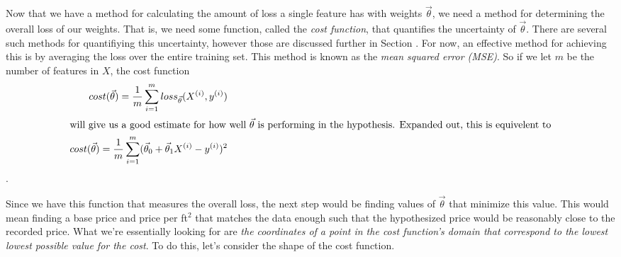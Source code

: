 Now that we have a method for calculating the amount of loss a single feature
has with weights $\vec\theta$, we need a method for determining the overall loss of
our weights. That is, we need some function, called the \emph{cost function},
that quantifies the uncertainty of $\vec\theta$. There are several such methods for
quantifiying this uncertainty, however those are discussed further in Section
\placeholder. For now, an effective method for achieving this is by averaging
the loss over the entire training set. This method is known as the \emph{mean
squared error (MSE)}. So if we let $m$ be the number of features in $X$, the
cost function
\begin{subequations}
    \begin{align}
        cost(\vec\theta) = \frac{1}{m}\sum_{i=1}^m loss_{\vec\theta}(X^{(i)}, y^{(i)}) \\
    \intertext{will give us a good estimate for how well $\vec\theta$ is performing
        in the hypothesis. Expanded out, this is equivelent to}
        cost(\vec\theta) = \frac{1}{m}\sum_{i=1}^m (\vec\theta_0 + \vec\theta_1X^{(i)} -
        y^{(i)})^2
    \end{align}
\end{subequations}
.

Since we have this function that measures the overall loss, the next step would
be finding values of $\vec\theta$ that minimize this value. This would mean finding
a base price and price per ft$^2$ that matches the data enough such that the
hypothesized price would be reasonably close to the recorded price. What we're
essentially looking for are \emph{the coordinates of a point in the cost
function's domain that correspond to the lowest lowest possible value for the
cost}. To do this, let's consider the shape of the cost function.

\begin{figure}[t!]
    \centering
    \caption{}
    \label{fg:cost}
\end{figure}

